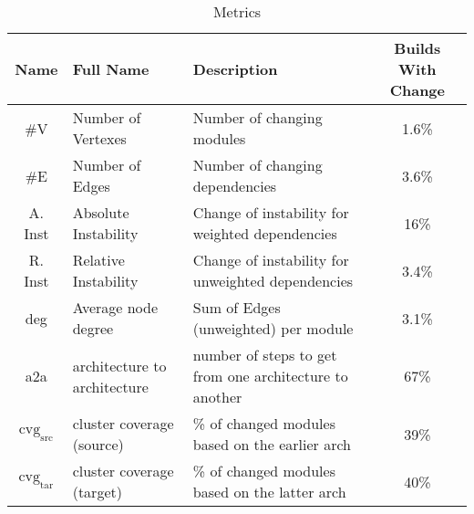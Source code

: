 \begin{table*}
	\caption{Metrics}
	\label{tableMetric}
	\centering
	\begin{tabular}{ | c | l | l | c |  }
		\hline
		Name & Full Name & Description & Builds With Change \\
		\hline
		\#V & Number of Vertexes & Number of changing modules & 1.6\%  \\
		\#E & Number of Edges & Number of changing dependencies & 3.6\% \\
		A. Inst & Absolute Instability & Change of instability for weighted dependencies & 16\% \\
		R. Inst & Relative Instability & Change of instability for unweighted dependencies & 3.4\% \\
		deg & Average node degree & Sum of Edges (unweighted) per module & 3.1\% \\
		a2a & architecture to architecture & number of steps to get from one architecture to another & 67\% \\
		$\text{cvg}_\text{src}$ & cluster coverage (source) & \% of changed modules based on the earlier arch & 39\% \\
		$\text{cvg}_\text{tar}$ & cluster coverage (target) & \% of changed modules based on the latter arch & 40\% \\
		\hline
	\end{tabular}
\end{table*}
